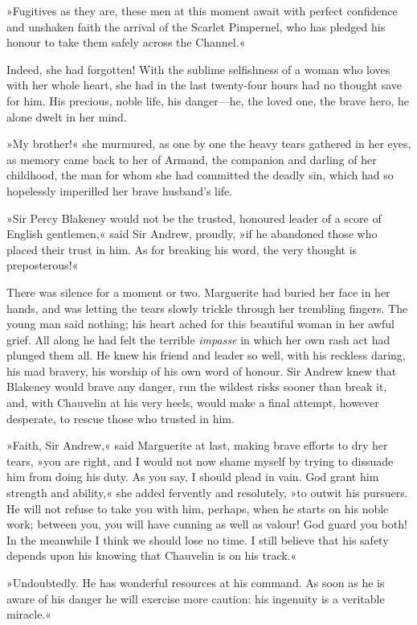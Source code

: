 »Fugitives as they are, these men at this moment await with perfect confidence and unshaken faith the arrival of the Scarlet Pimpernel, who has pledged his honour to take them safely across the Channel.«

Indeed, she had forgotten! With the sublime selfishness of a woman who loves with her whole heart, she had in the last twenty-four hours had no thought save for him. His precious, noble life, his danger\allowbreak---\allowbreak he, the loved one, the brave hero, he alone dwelt in her mind.

»My brother!« she murmured, as one by one the heavy tears gathered in her eyes, as memory came back to her of Armand, the companion and darling of her childhood, the man for whom she had committed the deadly sin, which had so hopelessly imperilled her brave husband's life.

»Sir Percy Blakeney would not be the trusted, honoured leader of a score of English gentlemen,« said Sir Andrew, proudly, »if he abandoned those who placed their trust in him. As for breaking his word, the very thought is preposterous!«

There was silence for a moment or two. Marguerite had buried her face in her hands, and was letting the tears slowly trickle through her trembling fingers. The young man said nothing; his heart ached for this beautiful woman in her awful grief. All along he had felt the terrible \textit{impasse} in which her own rash act had plunged them all. He knew his friend and leader so well, with his reckless daring, his mad bravery, his worship of his own word of honour. Sir Andrew knew that Blakeney would brave any danger, run the wildest risks sooner than break it, and, with Chauvelin at his very heels, would make a final attempt, however desperate, to rescue those who trusted in him.

»Faith, Sir Andrew,« said Marguerite at last, making brave efforts to dry her tears, »you are right, and I would not now shame myself by trying to dissuade him from doing his duty. As you say, I should plead in vain. God grant him strength and ability,« she added fervently and resolutely, »to outwit his pursuers. He will not refuse to take you with him, perhaps, when he starts on his noble work; between you, you will have cunning as well as valour! God guard you both! In the meanwhile I think we should lose no time. I still believe that his safety depends upon his knowing that Chauvelin is on his track.«

»Undoubtedly. He has wonderful resources at his command. As soon as he is aware of his danger he will exercise more caution: his ingenuity is a veritable miracle.«


